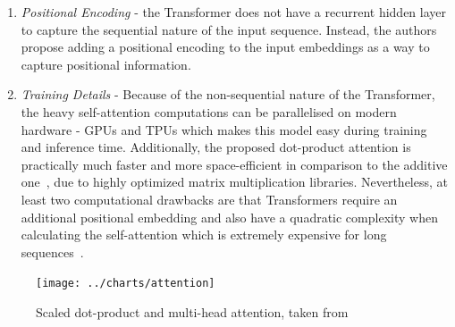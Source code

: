 \begin{enumerate}
\begin{itemize}
        \begin{equation}\label{eq:attention}
            \text{Attention}(Q, K, V) = \text{softmax}\left(\frac{QK^T}{\sqrt{d_k}}\right)V
        \end{equation}

        \item \emph{The multi-head attention}~\cite{vaswani2017attention} is a mechanism that allows the Transformer to learn multiple representations of the input sequence.
        This is achieved by stacking multiple attention heads (each with its own $Q$, $K$, $V$ matrices) and concatenating their outputs (Figure~\ref{fig:attention_dot_product}).
        For each head $h_i$, the $Q$, $K$, and $V$ vectors will be linearly projected with different weight matrices $W_i^Q$, $W_i^K$, and $W_i^V$, respectively.
        The intuition is that each attention head learns different aspects of the relationships that exist among inputs (e.g., syntactic, semantic, and discourse relationships~\cite{jurafsky2000}) and the concatenation of the different representations allows the Transformer to learn a richer overall representation of the input sequence.

    \end{itemize}
    \item \emph{Positional Encoding} - the Transformer does not have a recurrent hidden layer to capture the sequential nature of the input sequence.
    Instead, the authors~\cite{vaswani2017attention} propose adding a positional encoding to the input embeddings as a way to capture positional information.
    \item \emph{Training Details} - Because of the non-sequential nature of the Transformer, the heavy self-attention computations can be parallelised on modern hardware - GPUs and TPUs which makes this model easy during training and inference time.
    Additionally, the proposed dot-product attention is practically much faster and more space-efficient in comparison to the additive one~\cite{bahdanau2016neural}, due to highly optimized matrix multiplication libraries.
    Nevertheless, at least two computational drawbacks are that Transformers require an additional positional embedding and also have a quadratic complexity when calculating the self-attention which is extremely expensive for long sequences~\cite{jurafsky2000}.
\end{enumerate}

\begin{figure}[ht]
    \centering
    \texttt{[image: ../charts/attention]}~\caption{Scaled dot-product and multi-head attention, taken from~\cite{vaswani2017attention}}
    \label{fig:attention_dot_product}
\end{figure}

